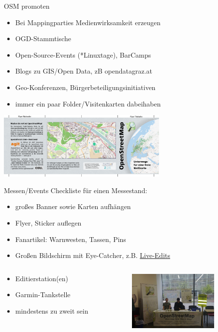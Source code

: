 \documentclass{beamer}
\begin{document}
\begin{frame}{OSM promoten}
	
	\begin{itemize}
		\item Bei Mappingparties Medienwirksamkeit erzeugen
		\item OGD-Stammtische
		\item Open-Source-Events (*Linuxtage), BarCamps
		\item Blogs zu GIS/Open Data, zB opendatagraz.at
		\item Geo-Konferenzen, Bürgerbeteiligungsinitiativen
			\pause
		\item immer ein paar Folder/Visitenkarten dabeihaben
	\end{itemize}
	\begin{center}
		\includegraphics[width=8.5cm]{Osmflyer-front-aut.pdf}
	\end{center}
\end{frame}

\begin{frame}{Messen/Events}
	Checkliste für einen Messestand:
	\begin{itemize}
		\item großes Banner sowie Karten aufhängen
		\item Flyer, Sticker auflegen
		\item Fanartikel: Warnwesten, Tassen, Pins
		\item Großen Bildschirm mit Eye-Catcher, z.B. \href{http://osmlab.github.io/show-me-the-way/}{Live-Edits}
	\end{itemize}
	\begin{columns}[t] 
		\begin{column}[T]{.4\textwidth}

	\begin{itemize}
		\item Editierstation(en)
		\item Garmin-Tankstelle
		\item mindestens zu zweit sein
	\end{itemize}
	\end{column}

	\begin{column}[T]{.5\textwidth}
				    \includegraphics[width=4.5cm]{liwo2013_stand_big.jpg}
				    \end{column}
				    \end{columns}
\end{frame}
\end{document}
